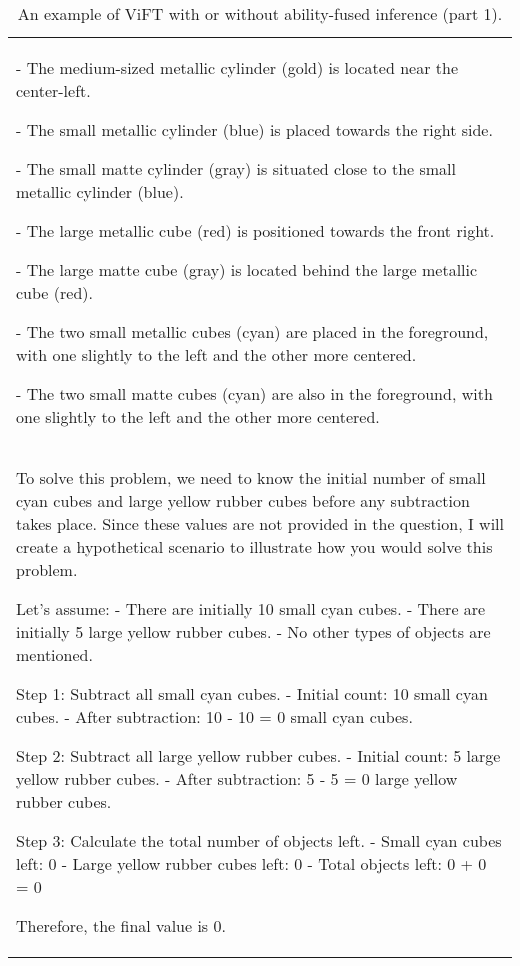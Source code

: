 \begin{table*}[htbp]
\begin{tabular}{p{14cm}}
\begin{tcolorbox}[colback=gray!5, colframe=gray!40, sharp corners, width=\linewidth, boxrule=0.5mm]
   - The medium-sized metallic cylinder (gold) is located near the center-left.
   
   - The small metallic cylinder (blue) is placed towards the right side.
   
   - The small matte cylinder (gray) is situated close to the small metallic cylinder (blue).
   
   - The large metallic cube (red) is positioned towards the front right.
   
   - The large matte cube (gray) is located behind the large metallic cube (red).
   
   - The two small metallic cubes (cyan) are placed in the foreground, with one slightly to the left and the other more centered.
   
   - The two small matte cubes (cyan) are also in the foreground, with one slightly to the left and the other more centered.


        \end{tcolorbox}



        \begin{tcolorbox}[colback=gray!5, colframe=gray!40, sharp corners, width=\linewidth, boxrule=0.5mm]
        \small
        \textbf{ViFT With Text-only Inputs:}
        \\
To solve this problem, we need to know the initial number of small cyan cubes and large yellow rubber cubes before any subtraction takes place. Since these values are not provided in the question, I will create a hypothetical scenario to illustrate how you would solve this problem.

Let's assume:
- There are initially 10 small cyan cubes.
- There are initially 5 large yellow rubber cubes.
- No other types of objects are mentioned.

Step 1: Subtract all small cyan cubes.
- Initial count: 10 small cyan cubes.
- After subtraction: 10 - 10 = 0 small cyan cubes.

Step 2: Subtract all large yellow rubber cubes.
- Initial count: 5 large yellow rubber cubes.
- After subtraction: 5 - 5 = 0 large yellow rubber cubes.

Step 3: Calculate the total number of objects left.
- Small cyan cubes left: 0
- Large yellow rubber cubes left: 0
- Total objects left: 0 + 0 = 0

Therefore, the final value is 0.


\end{tcolorbox}
\end{tabular}
\caption{An example of ViFT with or without ability-fused inference (part 1).}
\label{tab:case0}
\end{table*}




